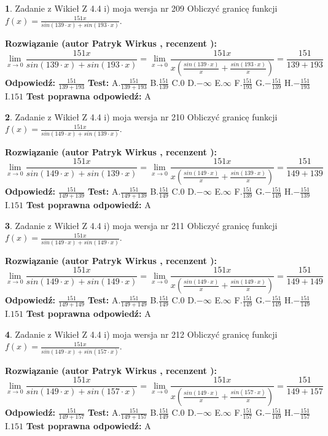 \documentclass[12pt, a4paper]{article}
\theoremstyle{definition} %
\newtheorem{zad}{}
\newcommand{\zadStart}[1]{\begin{zad}#1\newline}
\newcommand{\zadStop}{\end{zad}}
\newcommand{\rozwStart}[2]{\noindent \textbf{Rozwiązanie (autor #1 , recenzent #2): }\newline}
\newcommand{\rozwStop}{\newline}
\newcommand{\odpStart}{\noindent \textbf{Odpowiedź:}\newline}
\newcommand{\odpStop}{\newline}
\newcommand{\testStart}{\noindent \textbf{Test:}\newline}
\newcommand{\testStop}{\newline}
\newcommand{\kluczStart}{\noindent \textbf{Test poprawna odpowiedź:}\newline}
\newcommand{\kluczStop}{\newline}
\begin{document}
\zadStart{Zadanie z Wikieł Z 4.4 i) moja wersja nr 209}
Obliczyć granicę funkcji $f(x)=\frac{151x}{sin(139\cdot x) +sin(193\cdot x)}$.
\zadStop
\rozwStart{Patryk Wirkus}{}
$$\lim\limits_{x\to 0}\frac{151x}{sin(139\cdot x) +sin(193\cdot x)}=\lim\limits_{x\to 0}\frac{151x}{x(\frac{sin(139\cdot x)}{x}+\frac{sin(193\cdot x)}{x})}=\frac{151}{139+193}$$
\rozwStop
\odpStart
$\frac{151}{139+193}$
\odpStop
\testStart
A.$\frac{151}{139+193}$
B.$\frac{151}{139}$
C.$0$
D.$-\infty$
E.$\infty$
F.$\frac{151}{193}$
G.$-\frac{151}{139}$
H.$-\frac{151}{193}$
I.$151$
\testStop
\kluczStart
A
\kluczStop



\zadStart{Zadanie z Wikieł Z 4.4 i) moja wersja nr 210}
Obliczyć granicę funkcji $f(x)=\frac{151x}{sin(149\cdot x) +sin(139\cdot x)}$.
\zadStop
\rozwStart{Patryk Wirkus}{}
$$\lim\limits_{x\to 0}\frac{151x}{sin(149\cdot x) +sin(139\cdot x)}=\lim\limits_{x\to 0}\frac{151x}{x(\frac{sin(149\cdot x)}{x}+\frac{sin(139\cdot x)}{x})}=\frac{151}{149+139}$$
\rozwStop
\odpStart
$\frac{151}{149+139}$
\odpStop
\testStart
A.$\frac{151}{149+139}$
B.$\frac{151}{149}$
C.$0$
D.$-\infty$
E.$\infty$
F.$\frac{151}{139}$
G.$-\frac{151}{149}$
H.$-\frac{151}{139}$
I.$151$
\testStop
\kluczStart
A
\kluczStop



\zadStart{Zadanie z Wikieł Z 4.4 i) moja wersja nr 211}
Obliczyć granicę funkcji $f(x)=\frac{151x}{sin(149\cdot x) +sin(149\cdot x)}$.
\zadStop
\rozwStart{Patryk Wirkus}{}
$$\lim\limits_{x\to 0}\frac{151x}{sin(149\cdot x) +sin(149\cdot x)}=\lim\limits_{x\to 0}\frac{151x}{x(\frac{sin(149\cdot x)}{x}+\frac{sin(149\cdot x)}{x})}=\frac{151}{149+149}$$
\rozwStop
\odpStart
$\frac{151}{149+149}$
\odpStop
\testStart
A.$\frac{151}{149+149}$
B.$\frac{151}{149}$
C.$0$
D.$-\infty$
E.$\infty$
F.$\frac{151}{149}$
G.$-\frac{151}{149}$
H.$-\frac{151}{149}$
I.$151$
\testStop
\kluczStart
A
\kluczStop



\zadStart{Zadanie z Wikieł Z 4.4 i) moja wersja nr 212}
Obliczyć granicę funkcji $f(x)=\frac{151x}{sin(149\cdot x) +sin(157\cdot x)}$.
\zadStop
\rozwStart{Patryk Wirkus}{}
$$\lim\limits_{x\to 0}\frac{151x}{sin(149\cdot x) +sin(157\cdot x)}=\lim\limits_{x\to 0}\frac{151x}{x(\frac{sin(149\cdot x)}{x}+\frac{sin(157\cdot x)}{x})}=\frac{151}{149+157}$$
\rozwStop
\odpStart
$\frac{151}{149+157}$
\odpStop
\testStart
A.$\frac{151}{149+157}$
B.$\frac{151}{149}$
C.$0$
D.$-\infty$
E.$\infty$
F.$\frac{151}{157}$
G.$-\frac{151}{149}$
H.$-\frac{151}{157}$
I.$151$
\testStop
\kluczStart
A
\kluczStop
\end{document}
